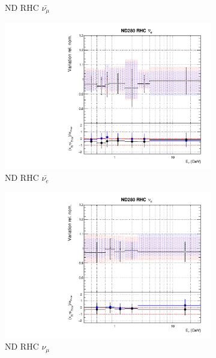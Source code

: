 \begin{figure}[t]
\begin{subfigure}{0.24\textwidth}
  \caption{ND RHC $\bar{\nu_{\mu}}$}
  \label{fig:}
\end{subfigure}
\begin{subfigure}{0.24\textwidth}
  \centering
  \includegraphics[width=0.95\linewidth]{figs/rhcmpasmvflux5}
  \caption{ND RHC $\bar{\nu_{e}}$}
  \label{fig:}
\end{subfigure}
\begin{subfigure}{0.24\textwidth}
  \centering
  \includegraphics[width=0.95\linewidth]{figs/rhcmpasmvflux6}
  \caption{ND RHC $\nu_{\mu}$}
  \label{fig:}
\end{subfigure}
\vspace{15mm}
\begin{subfigure}{0.24\textwidth}
  \centering

\end{subfigure}
\end{figure}
